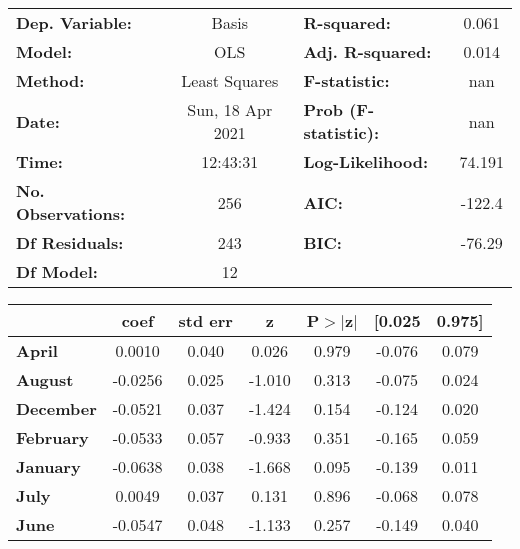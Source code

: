 \begin{center}
\begin{tabular}{lclc}
\toprule
\textbf{Dep. Variable:}    &      Basis       & \textbf{  R-squared:         } &     0.061   \\
\textbf{Model:}            &       OLS        & \textbf{  Adj. R-squared:    } &     0.014   \\
\textbf{Method:}           &  Least Squares   & \textbf{  F-statistic:       } &       nan   \\
\textbf{Date:}             & Sun, 18 Apr 2021 & \textbf{  Prob (F-statistic):} &      nan    \\
\textbf{Time:}             &     12:43:31     & \textbf{  Log-Likelihood:    } &    74.191   \\
\textbf{No. Observations:} &         256      & \textbf{  AIC:               } &    -122.4   \\
\textbf{Df Residuals:}     &         243      & \textbf{  BIC:               } &    -76.29   \\
\textbf{Df Model:}         &          12      & \textbf{                     } &             \\
\bottomrule
\end{tabular}
\begin{tabular}{lcccccc}
                   & \textbf{coef} & \textbf{std err} & \textbf{z} & \textbf{P$> |$z$|$} & \textbf{[0.025} & \textbf{0.975]}  \\
\midrule
\textbf{April}     &       0.0010  &        0.040     &     0.026  &         0.979        &       -0.076    &        0.079     \\
\textbf{August}    &      -0.0256  &        0.025     &    -1.010  &         0.313        &       -0.075    &        0.024     \\
\textbf{December}  &      -0.0521  &        0.037     &    -1.424  &         0.154        &       -0.124    &        0.020     \\
\textbf{February}  &      -0.0533  &        0.057     &    -0.933  &         0.351        &       -0.165    &        0.059     \\
\textbf{January}   &      -0.0638  &        0.038     &    -1.668  &         0.095        &       -0.139    &        0.011     \\
\textbf{July}      &       0.0049  &        0.037     &     0.131  &         0.896        &       -0.068    &        0.078     \\
\textbf{June}      &      -0.0547  &        0.048     &    -1.133  &         0.257        &       -0.149    &        0.040     \\

\end{tabular}
\end{center}
